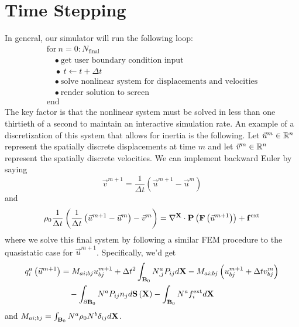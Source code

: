 \section*{Time Stepping}

In general, our simulator will run the following loop:
\begin{equation}
\begin{array}{lc}
\text{for} \ n = 0 : N_\text{final} \\
\quad \bullet \ \text{get user boundary condition input} \\
\quad \bullet \ t \leftarrow t + \Delta{t} \\
\quad \bullet \ \text{solve nonlinear system for displacements and velocities} \\
\quad \bullet \ \text{render solution to screen}\\
\text{end}
\end{array}
\end{equation}
The key factor is that the nonlinear system must be solved in less than one thirtieth of a second to maintain an interactive simulation rate. An example of a discretization of this system that allows for inertia is the following. Let $\vec{u}^m \in \mathbb{R}^n$ represent the spatially discrete displacements at time $m$ and let $\vec{v}^m \in \mathbb{R}^n$ represent the spatially discrete velocities. We can implement backward Euler by saying
\begin{equation*}
\vec{v}^{m+1} = \frac{1}{\Delta t} \left( \vec{u}^{m+1} - \vec{u}^m \right)
\end{equation*}
and
\begin{equation*}
\rho_0 \frac{1}{\Delta t} \left( \frac{1}{\Delta t} \left( \vec{u}^{m+1} - \vec{u}^m \right) - \vec{v}^m \right) = \nabla^{\mathbf{X}} \cdot \mathbf{P} \left( \mathbf{F} \left( \vec{u}^{m+1} \right) \right) + \mathbf{f}^{\text{ext}}
\end{equation*}
where we solve this final system by following a similar FEM procedure to the quasistatic case for $\vec{u}^{m+1}$. Specifically, we'd get
\begin{align*}
q^a_i \left( \vec{u}^{m+1} \right)
& = M_{ai;bj} u^{m+1}_{bj} + \Delta t^2 \int_{\mathbf{B}_0} N^a_{,j} P_{ij} d\mathbf{X} - M_{ai;bj} \left( u^{m+1}_{bj} + \Delta{t} v^m_{bj} \right) \\
& \quad {} - \int_{\partial\mathbf{B}_0} N^a P_{ij} n_j d\mathbf{S} \left( \mathbf{X} \right) - \int_{\mathbf{B}_0} N^a f^{\text{ext}}_i d\mathbf{X}
\end{align*}
and $M_{ai;bj}=\int_{\mathbf{B}_0} N^a \rho_0 N^b \delta_{ij} d\mathbf{X}$.
